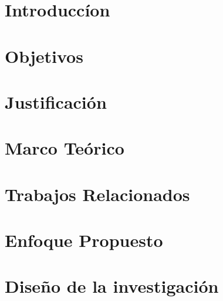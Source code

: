 \documentclass[journal]{IEEEtran}
\begin{document}



\maketitle





\section{Introduccíon}


\section{Objetivos}


\section{Justificación}


\section{Marco Teórico}


\section{Trabajos Relacionados}


\section{Enfoque Propuesto}


\section{Diseño de la investigación}

\end{document}
